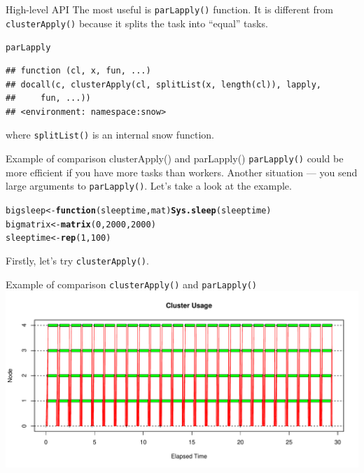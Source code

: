 \documentclass[aspectratio=169]{beamer}\usepackage[]{graphicx}\usepackage[]{color}
\makeatletter
\newcommand{\hlnum}[1]{\textcolor[rgb]{0.686,0.059,0.569}{#1}}%
\newcommand{\hlstd}[1]{\textcolor[rgb]{0.345,0.345,0.345}{#1}}%
\newcommand{\hlkwa}[1]{\textcolor[rgb]{0.161,0.373,0.58}{\textbf{#1}}}%
\newcommand{\hlkwb}[1]{\textcolor[rgb]{0.69,0.353,0.396}{#1}}%
\newcommand{\hlkwc}[1]{\textcolor[rgb]{0.333,0.667,0.333}{#1}}%
\newcommand{\hlkwd}[1]{\textcolor[rgb]{0.737,0.353,0.396}{\textbf{#1}}}%
\newenvironment{kframe}{%
 \def\at@end@of@kframe{}%
 \ifinner\ifhmode%
  \def\at@end@of@kframe{\end{minipage}}%
  \begin{minipage}{\columnwidth}%
 \fi\fi%
 \def\FrameCommand##1{\hskip\@totalleftmargin \hskip-\fboxsep
 \colorbox{shadecolor}{##1}\hskip-\fboxsep
     \hskip-\linewidth \hskip-\@totalleftmargin \hskip\columnwidth}%
 \MakeFramed {\advance\hsize-\width
   \@totalleftmargin\z@ \linewidth\hsize
   \@setminipage}}%
 {\par\unskip\endMakeFramed%
 \at@end@of@kframe}
\newenvironment{knitrout}{}{} %
\makeatother
\begin{document}
\begin{frame}[fragile]{High-level API}
  The most useful is \texttt{parLapply()} function. It is different from \texttt{clusterApply()} because it splits the task into ``equal'' tasks.
\begin{knitrout}\scriptsize
{}\color{fgcolor}\begin{kframe}
\begin{alltt}
\hlstd{parLapply}
\end{alltt}
\begin{verbatim}
## function (cl, x, fun, ...) 
## docall(c, clusterApply(cl, splitList(x, length(cl)), lapply, 
##     fun, ...))
## <environment: namespace:snow>
\end{verbatim}
\end{kframe}
\end{knitrout}
where \texttt{splitList()} is an internal snow function. 
\end{frame}

\begin{frame}[fragile]{Example of comparison clusterApply() and parLapply()}
  \texttt{parLapply()} could be more efficient if you have more tasks than workers.
  Another situation --- you send large arguments to \texttt{parLapply()}.
  Let's take a look at the example.
\begin{knitrout}\scriptsize
{}\color{fgcolor}\begin{kframe}
\begin{alltt}
\hlstd{bigsleep} \hlkwb{<-} \hlkwa{function}\hlstd{(}\hlkwc{sleeptime}\hlstd{,} \hlkwc{mat}\hlstd{)} \hlkwd{Sys.sleep}\hlstd{(sleeptime)}
\hlstd{bigmatrix} \hlkwb{<-} \hlkwd{matrix}\hlstd{(}\hlnum{0}\hlstd{,} \hlnum{2000}\hlstd{,} \hlnum{2000}\hlstd{)}
\hlstd{sleeptime} \hlkwb{<-} \hlkwd{rep}\hlstd{(}\hlnum{1}\hlstd{,} \hlnum{100}\hlstd{)}
\end{alltt}
\end{kframe}
\end{knitrout}
  Firstly, let's try \texttt{clusterApply()}.
\end{frame}

\begin{frame}[fragile]{Example of comparison \texttt{clusterApply()} and \texttt{parLapply()}}
\begin{knitrout}\tiny
{}\color{fgcolor}
\includegraphics[width=.89\linewidth]{figure/unnamed-chunk-15-1} 

\end{knitrout}
\end{frame}
\end{document}
